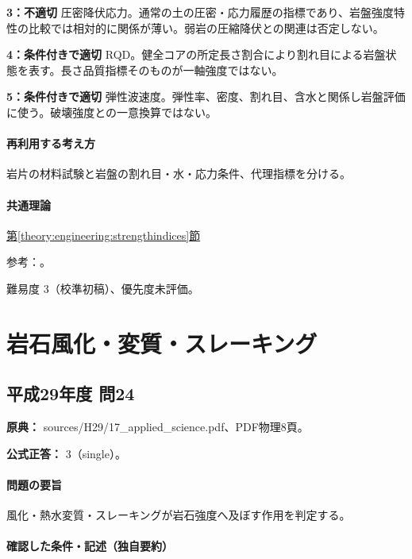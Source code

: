 \noindent\textbf{3：不適切} 圧密降伏応力。通常の土の圧密・応力履歴の指標であり、岩盤強度特性の比較では相対的に関係が薄い。弱岩の圧縮降伏との関連は否定しない。\par

\noindent\textbf{4：条件付きで適切} RQD。健全コアの所定長さ割合により割れ目による岩盤状態を表す。長さ品質指標そのものが一軸強度ではない。\par

\noindent\textbf{5：条件付きで適切} 弾性波速度。弾性率、密度、割れ目、含水と関係し岩盤評価に使う。破壊強度との一意換算ではない。\par

\paragraph{再利用する考え方} 岩片の材料試験と岩盤の割れ目・水・応力条件、代理指標を分ける。

\paragraph{共通理論} \hyperref[theory:engineering:strengthindices]{第\ref*{theory:engineering:strengthindices}節}

\par 参考：\cite{jseg_engineering_faq,geebec_ps}。

\par 難易度 3（校準初稿）、優先度未評価。

\section{岩石風化・変質・スレーキング}

\subsection{平成29年度 問24}
\label{q:h29-reg-applied-24}

\noindent\textbf{原典：} sources/H29/17\_applied\_science.pdf、PDF物理8頁。

\textbf{公式正答：} 3（single）。

\paragraph{問題の要旨} 風化・熱水変質・スレーキングが岩石強度へ及ぼす作用を判定する。

\paragraph{確認した条件・記述（独自要約）}\mbox{}\par


